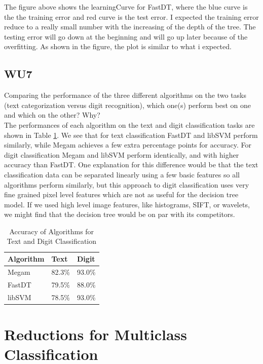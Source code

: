 \documentclass[a4paper,11pt]{article}
\begin{document}
The figure above shows the learningCurve for FastDT, where the blue curve is the the training error and red curve is the test error. I expected the training error reduce to a really small number with the increasing of the depth of the tree. The testing error will go down at the beginning and will go up later because of the overfitting. As shown in the figure, the plot is similar to what i expected.


\subsection{WU7}
\textsf{Comparing the performance of the three different algorithms 
on the two tasks (text categorization versus digit recognition), 
which one(s) perform best on one and which on the other? Why?}\\

The performances of each algorithm on the text and digit classification 
tasks are shown in Table \ref{tables:WU7}. We see that for text 
classification FastDT and libSVM perform similarly, while Megam achieves a 
few extra percentage points for accuracy. For digit classification Megam and 
libSVM perform identically, and with higher accuracy than FastDT. One 
explanation for this difference would be that the text classification data 
can be separated linearly using a few basic features so all algorithms 
perform similarly, but this approach to digit classification uses very fine 
grained pixel level features which are not as useful for the decision tree 
model. If we used high level image features, like histograms, SIFT, or 
wavelets, we might find that the decision tree would be on par with
its competitors.

\begin{table}[!ht]
\begin{center}
    \caption{Accuracy of Algorithms for Text and Digit Classification}
    \begin{tabular}{ | l | l | l |} \hline
    Algorithm & Text   & Digit \\ \hline
    Megam     & 82.3\% & 93.0\% \\ \hline
    FastDT    & 79.5\% & 88.0\% \\ \hline
    libSVM    & 78.5\% & 93.0\% \\ \hline
    \end{tabular}
    \label{tables:WU7}
\end{center}
\end{table}

\pagebreak
\section{Reductions for Multiclass Classification}
\end{document}
